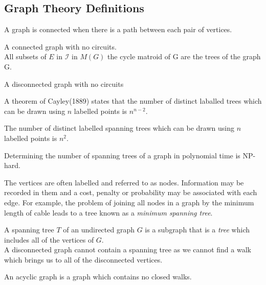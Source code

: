 \documentclass[../main.tex]{subfiles}
\begin{document}
\subsection{Graph Theory Definitions}
 
\begin{defn}[Connected]
A graph is connected when there is a path between each pair of vertices.
\end{defn}
 
 \begin{defn}[Tree]
 A connected graph with no circuits.\\
 \noindent All subsets of $E$ in $\mathcal{I}$ in $M(G)$ the cycle matroid of G are the trees of the graph G.
 \end{defn}
 \begin{defn}[Forest]
 A disconnected graph with no circuits
 \end{defn}
 \begin{prop}
 A theorem of Cayley(1889) states that the number of distinct laballed trees which can be drawn using $n$ labelled points is $ n^{n-2}$.
 \end{prop}

\begin{cor}
The number of distinct labelled spanning trees which can be drawn using $n$ labelled points is $n^2.$ 
\end{cor}

\begin{rem}
Determining the number of spanning trees of a graph in polynomial time is NP-hard.
\end{rem}
 
\noindent The vertices are often labelled and referred to as nodes. Information may be recorded in them and a cost, penalty or probability may be associated with each edge. For example, the problem of joining all nodes in a graph by the minimum length of cable leads to a tree known as a \textit{minimum spanning tree}.
 
\begin{defn}
A spanning tree $T$ of an undirected graph $G$ is a subgraph that is a \textit{tree} which includes all of the vertices of $G.$\\
\noindent A disconnected graph cannot contain a spanning tree as we cannot find a walk which brings us to all of the disconnected vertices.
\end{defn}
 
\begin{defn}[Acyclic]
An acyclic graph is a graph which contains no closed walks.
\end{defn}
\end{document}
